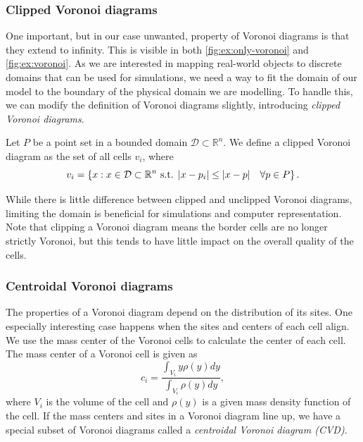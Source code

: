 \subsubsection{Clipped Voronoi diagrams}
One important, but in our case unwanted, property of Voronoi diagrams is that they extend to infinity. This is visible in both \autoref{fig:ex:only-voronoi} and \autoref{fig:ex:voronoi}. As we are interested in mapping real-world objects to discrete domains that can be used for simulations, we need a way to fit the domain of our model to the boundary of the physical domain we are modelling. To handle this, we can modify the definition of Voronoi diagrams slightly, introducing \emph{clipped Voronoi diagrams}.

\begin{definition}
Let $P$ be a point set in a bounded domain $\mathcal{D} \subset \mathbb{R}^n$. We define a clipped Voronoi diagram as the set of all cells $v_i$, where
\begin{equation}
\label{eq:clipped-voronoi}
    v_i = \left\{ x : x \in \mathcal{D}\subset \mathbb{R}^n \text{ s.t. } \lvert x - p_i\rvert \leq \lvert x - p\rvert\quad \forall p \in P \right\}.
\end{equation}
\end{definition}

While there is little difference between clipped and unclipped Voronoi diagrams, limiting the domain is beneficial for simulations and computer representation. Note that clipping a Voronoi diagram means the border cells are no longer strictly Voronoi, but this tends to have little impact on the overall quality of the cells.

\subsubsection{Centroidal Voronoi diagrams}
\label{sec:CVD}
The properties of a Voronoi diagram depend on the distribution of its sites. One especially interesting case happens when the sites and centers of each cell align. We use the mass center of the Voronoi cells to calculate the center of each cell. The mass center of a Voronoi cell is given as
\begin{equation}
    c_i = \frac
        {\int_{V_i} y \rho(y) dy}
        {\int_{V_i} \rho(y) dy},
\end{equation}
where $V_i$ is the volume of the cell and $\rho(y)$ is a given mass density function of the cell. If the mass centers and sites in a Voronoi diagram line up, we have a special subset of Voronoi diagrams called a \emph{centroidal Voronoi diagram (CVD)}.

